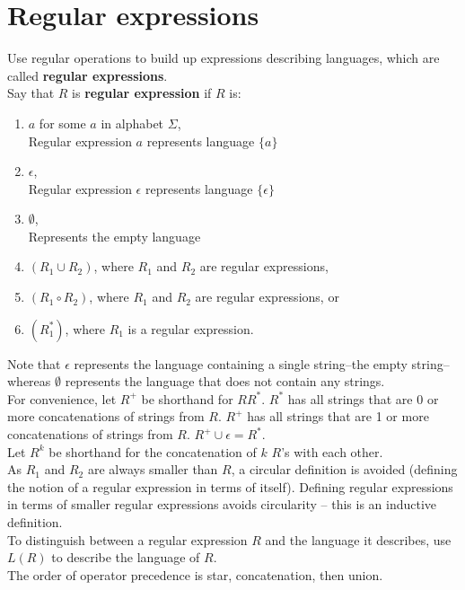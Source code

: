 \documentclass{article}
\begin{document}
\section{Regular expressions}
Use regular operations to build up expressions describing languages, which are called \textbf{regular expressions}.\medskip
\\ Say that $R$ is \textbf{regular expression} if $R$ is:
\begin{enumerate}
	\item $a$ for some $a$ in alphabet $\Sigma$,
	\\ Regular expression $a$ represents language $\{a\}$
	\item $\epsilon$,
	\\ Regular expression $\epsilon$ represents language $\{\epsilon\}$
	\item $\emptyset$,
	\\ Represents the empty language
	\item $(R_1 \cup R_2)$, where $R_1$ and $R_2$ are regular expressions,
	\item $(R_1 \circ R_2)$, where $R_1$ and $R_2$ are regular expressions, or
	\item $(R_1^*)$, where $R_1$ is a regular expression.
\end{enumerate}
Note that $\epsilon$ represents the language containing a single string--the empty string--whereas $\emptyset$ represents the language that does not contain any strings.\medskip
\\ For convenience, let $R^+$ be shorthand for $RR^*$. $R^*$ has all strings that are 0 or more concatenations of strings from $R$. $R^+$ has all strings that are 1 or more concatenations of strings from $R$. $R^+ \cup \epsilon = R^*$.\medskip
\\ Let $R^k$ be shorthand for the concatenation of $k$ $R$'s with each other.\medskip
\\ As $R_1$ and $R_2$ are always smaller than $R$, a circular definition is avoided (defining the notion of a regular expression in terms of itself). Defining regular expressions in terms of smaller regular expressions avoids circularity -- this is an inductive definition.\medskip
\\ To distinguish between a regular expression $R$ and the language it describes, use $L(R)$ to describe the language of $R$.\medskip
\\ The order of operator precedence is star, concatenation, then union.
\end{document}
